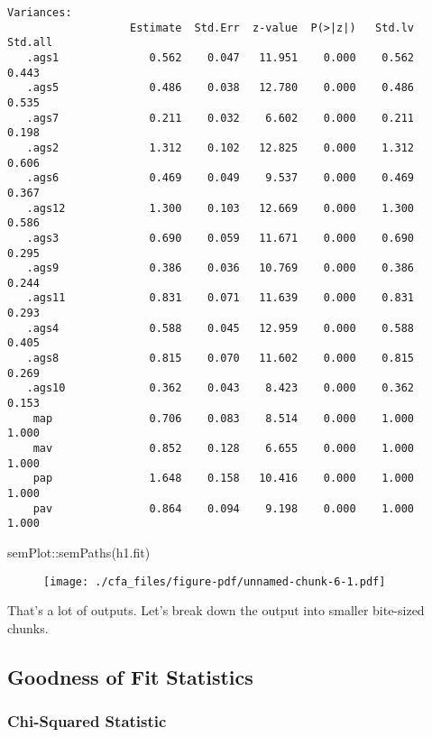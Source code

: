 \documentclass[
  letterpaper,
  DIV=11,
  numbers=noendperiod]{scrreprt}
\newenvironment{Shaded}{\begin{snugshade}}{\end{snugshade}}
\newcommand{\FunctionTok}[1]{\textcolor[rgb]{0.28,0.35,0.67}{#1}}
\newcommand{\NormalTok}[1]{\textcolor[rgb]{0.00,0.23,0.31}{#1}}
\newcommand{\SpecialCharTok}[1]{\textcolor[rgb]{0.37,0.37,0.37}{#1}}
\begin{document}
\begin{verbatim}
Variances:
                   Estimate  Std.Err  z-value  P(>|z|)   Std.lv  Std.all
   .ags1              0.562    0.047   11.951    0.000    0.562    0.443
   .ags5              0.486    0.038   12.780    0.000    0.486    0.535
   .ags7              0.211    0.032    6.602    0.000    0.211    0.198
   .ags2              1.312    0.102   12.825    0.000    1.312    0.606
   .ags6              0.469    0.049    9.537    0.000    0.469    0.367
   .ags12             1.300    0.103   12.669    0.000    1.300    0.586
   .ags3              0.690    0.059   11.671    0.000    0.690    0.295
   .ags9              0.386    0.036   10.769    0.000    0.386    0.244
   .ags11             0.831    0.071   11.639    0.000    0.831    0.293
   .ags4              0.588    0.045   12.959    0.000    0.588    0.405
   .ags8              0.815    0.070   11.602    0.000    0.815    0.269
   .ags10             0.362    0.043    8.423    0.000    0.362    0.153
    map               0.706    0.083    8.514    0.000    1.000    1.000
    mav               0.852    0.128    6.655    0.000    1.000    1.000
    pap               1.648    0.158   10.416    0.000    1.000    1.000
    pav               0.864    0.094    9.198    0.000    1.000    1.000
\end{verbatim}

\begin{Shaded}
\begin{Highlighting}[]
\NormalTok{semPlot}\SpecialCharTok{::}\FunctionTok{semPaths}\NormalTok{(h1.fit)}
\end{Highlighting}
\end{Shaded}

\begin{figure}[H]

{\centering \texttt{[image: ./cfa\_files/figure-pdf/unnamed-chunk-6-1.pdf]}

}

\end{figure}

That's a lot of outputs. Let's break down the output into smaller
bite-sized chunks.

\hypertarget{goodness-of-fit-statistics}{%
\subsection{Goodness of Fit
Statistics}\label{goodness-of-fit-statistics}}

\hypertarget{chi-squared-statistic}{%
\subsubsection{Chi-Squared Statistic}\label{chi-squared-statistic}}
\end{document}
